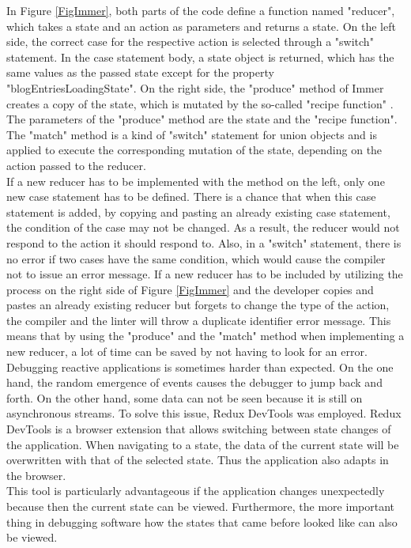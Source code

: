 \documentclass[Bachelor,BIF,english]{twbook}
\begin{document}
In Figure \ref{FigImmer}, both parts of the code define a function named "reducer", which takes a state and an action as parameters and returns a state. On the left side, the correct case for the respective action is selected through a "switch" statement. In the case statement body, a state object is returned, which has the same values as the passed state except for the property "blogEntriesLoadingState". On the right side, the "produce" method of Immer creates a copy of the state, which is mutated by the so-called "recipe function" \cite{Immer}. The parameters of the "produce" method are the state and the "recipe function". The "match" method is a kind of "switch" statement for union objects and is applied to execute the corresponding mutation of the state, depending on the action passed to the reducer.
\\[\baselineskip]
If a new reducer has to be implemented with the method on the left, only one new case statement has to be defined. There is a chance that when this case statement is added, by copying and pasting an already existing case statement, the condition of the case may not be changed. As a result, the reducer would not respond to the action it should respond to. Also, in a "switch" statement, there is no error if two cases have the same condition, which would cause the compiler not to issue an error message. If a new reducer has to be included by utilizing the process on the right side of Figure \ref{FigImmer} and the developer copies and pastes an already existing reducer but forgets to change the type of the action, the compiler and the linter will throw a duplicate identifier error message. This means that by using the "produce" and the "match" method when implementing a new reducer, a lot of time can be saved by not having to look for an error.
\\[\baselineskip]
Debugging reactive applications is sometimes harder than expected. On the one hand, the random emergence of events causes the debugger to jump back and forth. On the other hand, some data can not be seen because it is still on asynchronous streams. To solve this issue, Redux DevTools \cite{ReduxDevTools} was employed. Redux DevTools is a browser extension that allows switching between state changes of the application. When navigating to a state, the data of the current state will be overwritten with that of the selected state. Thus the application also adapts in the browser. 
\\[\baselineskip]
This tool is particularly advantageous if the application changes unexpectedly because then the current state can be viewed. Furthermore, the more important thing in debugging software how the states that came before looked like can also be viewed.
\end{document}
